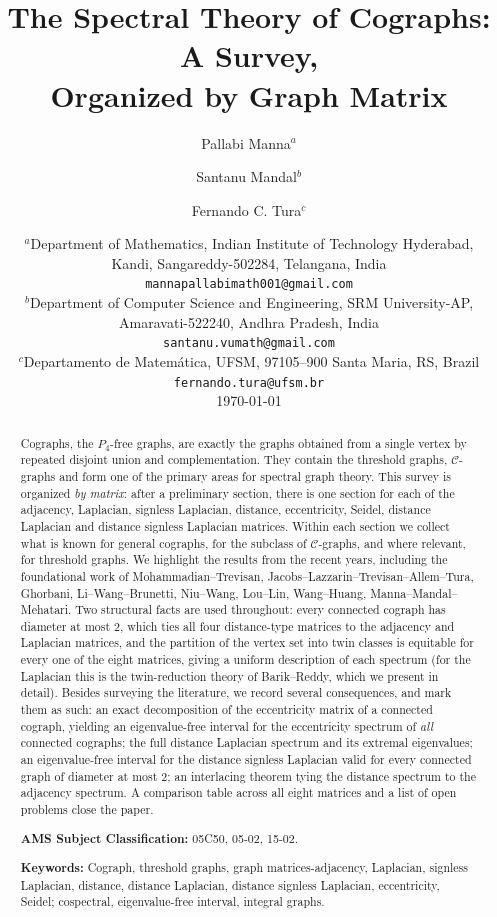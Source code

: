 \documentclass[11pt]{article}
\title{The Spectral Theory of Cographs: A Survey,\\ Organized by Graph Matrix}
\author{
	Pallabi Manna$^{a}$ \and Santanu Mandal$^{b}$ \and
	Fernando C. Tura$^{c}$
}
\date{
	\small
	$^a$Department of Mathematics, Indian Institute of Technology Hyderabad,\\ Kandi, Sangareddy-502284, Telangana, India\\
	\texttt{mannapallabimath001@gmail.com}\\[2mm]
	$^{b}$Department of Computer Science and Engineering, SRM University-AP,\\ Amaravati-522240, Andhra Pradesh, India\\
	\texttt{santanu.vumath@gmail.com}  \\[2mm]
	$^c$Departamento de Matemática, UFSM, 97105–900 Santa Maria, RS, Brazil\\
	\texttt{fernando.tura@ufsm.br} 
	\\[4mm]
	\today
}
\theoremstyle{plain}
\theoremstyle{definition}
\theoremstyle{remark}
\begin{document}
	\maketitle
	
	\begin{abstract}
		Cographs, the $P_4$-free graphs, are exactly the graphs obtained from a single vertex by repeated disjoint union and complementation. They contain the threshold graphs, $\mathcal{C}$-graphs and form one of the primary areas for spectral graph theory. This survey is organized \emph{by matrix}: after a preliminary section, there is one section for each of the adjacency, Laplacian, signless Laplacian, distance, eccentricity, Seidel, distance Laplacian and distance signless Laplacian matrices. Within each section we collect what is known for general cographs, for the subclass of $\mathcal{C}$-graphs, and where relevant, for threshold graphs. We highlight the results from the recent years, including the foundational work of Mohammadian--Trevisan, Jacobs--Lazzarin--Trevisan--Allem--Tura, Ghorbani, Li--Wang--Brunetti, Niu--Wang, Lou--Lin, Wang--Huang,  Manna--Mandal--Mehatari. 
		Two structural facts are used throughout: every connected cograph has diameter at most $2$, which ties all four distance-type matrices to the adjacency and Laplacian matrices, and the partition of the vertex set into twin classes is equitable for every one of the eight matrices, giving a uniform description of each spectrum (for the Laplacian this is the twin-reduction theory of Barik--Reddy, which we present in detail). Besides surveying the literature, we record several consequences, and mark them as such: an exact decomposition of the eccentricity matrix of a connected cograph, yielding an eigenvalue-free interval for the eccentricity spectrum of \emph{all} connected cographs; the full distance Laplacian spectrum and its extremal eigenvalues; an eigenvalue-free interval for the distance signless Laplacian valid for every connected graph of diameter at most $2$; an interlacing theorem tying the distance spectrum to the adjacency spectrum. A comparison table across all eight matrices and a list of open problems close the paper.
		
		
		\medskip
		\noindent\textbf{AMS Subject Classification:} 05C50, 05-02, 15-02.
		
		\smallskip
		\noindent\textbf{Keywords:} Cograph, threshold graphs, graph matrices-adjacency, Laplacian, signless Laplacian, distance, distance Laplacian, distance signless Laplacian, eccentricity, Seidel; cospectral, eigenvalue-free interval, integral graphs.
	\end{abstract}
	
\end{document}
